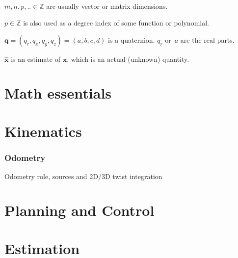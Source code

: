 \documentclass[a4paper,11pt]{article}
\begin{document}
$m,n,p,.. \in \mathbb{Z}$ are usually vector or matrix dimensions.

$p \in \mathbb{Z}$ is also used as a degree index of some function or polynomial. 

$\mathbf{q} = (q_r,q_x,q_y,q_z) = (a,b,c,d)$ is a quaternion. $q_r$ or~$a$ are the real parts.

$\hat{\mathbf{x}}$ is an estimate of $\mathbf{x}$, which is an actual (unknown) quantity.

\newpage
\part{Math essentials}

\newpage


\newpage


\newpage


\newpage


\newpage


\newpage


\newpage


\newpage
\part{Kinematics}

\newpage


\newpage
\section{Odometry}
Odometry role, sources and 2D/3D twist integration

\newpage
\part{Planning and Control}

\newpage


\newpage
\part{Estimation}

\newpage



\newpage

\end{document}
